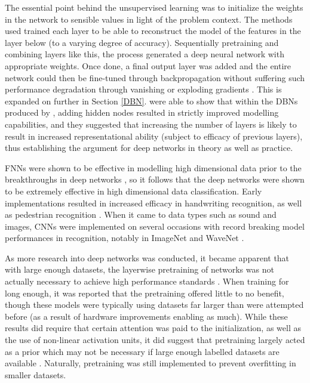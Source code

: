 \documentclass[a4paper,11pt,oneside]{article}
\theoremstyle{plain}
\theoremstyle{definition}
\begin{document}
	The essential point behind the unsupervised learning was to initialize the weights in the network to sensible 
	values in light of the problem context. The methods used trained each layer to be able to reconstruct the model 
	of the features in the layer below (to a varying degree of accuracy). Sequentially pretraining and combining 
	layers like this, the process generated a deep neural network with appropriate weights. Once done, a final output 
	layer was added and the entire network could then be fine-tuned through backpropagation without suffering 
	such performance degradation through vanishing or exploding gradients \citep{Hinton1, Ranzato1, Hinton2}. This is 
	expanded on further in Section \ref{DBN}. \citet{LeRoux} were able to show that within the DBNs produced by 
	\citet{Hinton1}, adding hidden nodes resulted in strictly improved modelling capabilities, and they suggested 
	that increasing the number of layers is likely to result in increased representational ability (subject to efficacy of 
	previous layers), thus establishing the argument for deep networks in theory as well as practice.
	\hfill \break 
	
	FNNs were shown to be effective in modelling high dimensional data prior to the breakthroughs in 
	deep networks \citep{Bengio2}, so it follows that the deep networks were shown to be extremely effective in high dimensional 
	data classification. Early implementations resulted in increased efficacy in handwriting recognition, as well as pedestrian 
	recognition \citep{Sermanet}. When it came to data types such as sound and images, CNNs were implemented on several 
	occasions with record breaking model performances in recognition, notably in ImageNet and WaveNet \citep{ImageNet, WaveNet}.
	\hfill \break 
	
	As more research into deep networks was conducted, it became apparent that with large enough datasets, the
	layerwise pretraining of networks was not actually necessary to achieve high performance standards 
	\citep{ImageNet, Glorot2, Ciresan}. When training for long enough, it was reported that the pretraining offered little to no 
	benefit, though these models were typically using datasets far larger than were attempted before (as a result of
	hardware improvements enabling as much). While these results did require that certain attention was paid to the 
	initialization, as well as the use of non-linear activation units, it did suggest that pretraining largely acted as a prior 
	which may not be necessary if large enough labelled datasets are available \citep{Bengio3}. Naturally, pretraining was still 
	implemented to prevent overfitting in smaller datasets.
	\hfill \break 
	
\end{document}
